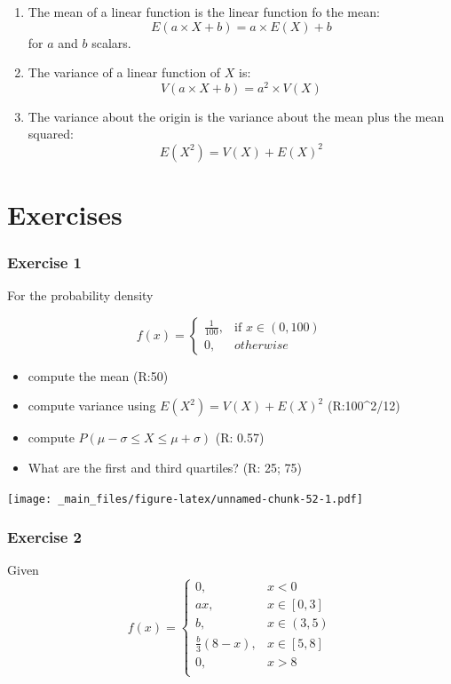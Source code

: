 \documentclass[
]{book}
\providecommand{\tightlist}{%
  \setlength{\itemsep}{0pt}\setlength{\parskip}{0pt}}
\begin{document}
\begin{enumerate}
\def\labelenumi{\arabic{enumi})}
\item
  The mean of a linear function is the linear function fo the mean: \[E(a\times X +b)= a\times E(X) +b\] for \(a\) and \(b\) scalars.
\item
  The variance of a linear function of \(X\) is:\[V(a\times X +b)= a^2\times V(X)\]
\item
  The variance about the origin is the variance about the mean plus the mean squared: \[E(X^2)=V(X)+E(X)^2\]
\end{enumerate}

\hypertarget{exercises-4}{%
\section{Exercises}\label{exercises-4}}

\hypertarget{exercise-1-3}{%
\subsubsection{Exercise 1}\label{exercise-1-3}}

For the probability density

\[
    f(x)= 
\begin{cases}
    \frac{1}{100},& \text{if } x\in (0,100)\\
    0,& otherwise 
\end{cases}
\]

\begin{itemize}
\tightlist
\item
  compute the mean (R:50)
\item
  compute variance using \(E(X^2)=V(X)+E(X)^2\) (R:100\^{}2/12)
\item
  compute \(P(\mu-\sigma\leq X \leq \mu+\sigma)\) (R: 0.57)
\item
  What are the first and third quartiles? (R: 25; 75)
\end{itemize}

\texttt{[image: \_main\_files/figure-latex/unnamed-chunk-52-1.pdf]}

\hypertarget{exercise-2-3}{%
\subsubsection{Exercise 2}\label{exercise-2-3}}

Given
\[
    f(x)= 
\begin{cases}
0, & x < 0 \\
ax, & x \in [0,3] \\
b, & x \in (3,5) \\
\frac{b}{3}(8-x),& x \in [5,8]\\
0, & x > 8 \\
\end{cases}
\]
\end{document}
